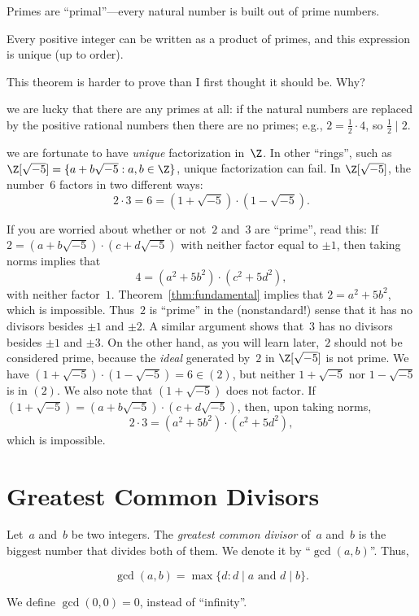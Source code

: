 \documentclass[11pt]{report}
\begin{document}
Primes are ``primal''---every natural number is
built out of prime numbers.
\begin{theorem}\label{thm:fundamental}
  Every positive integer can be written as a product of primes,
  and this expression is unique (up to order).
\end{theorem}

 This theorem is harder to prove than I first thought it
should be.  Why?

we are lucky that there are any primes at all: if
the natural numbers are replaced by the positive rational numbers then
there are no primes; e.g., $2 = \frac{1}{2}\cdot 4$, so
$\frac{1}{2}\mid 2$.

we are fortunate to have {\em unique}
factorization in~$\Z$. In other ``rings'', such as $\Z[\sqrt{-5}]
  = \{a + b\sqrt{-5} : a, b\in\Z\}$, unique factorization can fail.
In $\Z[\sqrt{-5}]$, the number~$6$ factors in two different ways:
$$2\cdot 3 = 6 = (1+\sqrt{-5})\cdot (1-\sqrt{-5}).$$

\begin{advanced}
  If you are worried about whether or not~$2$ and~$3$ are ``prime'', read this:
  If $2 = (a+b\sqrt{-5})\cdot (c+d\sqrt{-5})$ with neither factor equal
  to $\pm 1$, then taking norms implies that
  $$4 = (a^2 + 5b^2)\cdot (c^2 + 5d^2),$$
  with neither
  factor~$1$.  Theorem~\ref{thm:fundamental} implies that
  $2=a^2 + 5b^2$, which is impossible.
  Thus~$2$ is ``prime'' in the (nonstandard!) sense that it
  has no divisors besides $\pm 1$ and $\pm 2$.
  A similar argument shows that~$3$
  has no divisors besides $\pm 1$ and $\pm 3$.
  On the other hand, as you will learn later,~$2$ should not be
  considered prime, because the {\em ideal} generated by~$2$
  in $\Z[\sqrt{-5}]$ is not prime.  We have
  $(1+\sqrt{-5})\cdot (1-\sqrt{-5}) = 6\in (2)$, but
  neither $1+\sqrt{-5}$ nor $1-\sqrt{-5}$ is in $(2)$.
  We also note that $(1+\sqrt{-5})$ does not factor.
  If $(1+\sqrt{-5}) = (a+b\sqrt{-5})\cdot (c+d\sqrt{-5})$,
  then, upon taking norms,
  $$2\cdot 3 = (a^2 + 5b^2)\cdot (c^2 + 5d^2),$$
  which is impossible.

\end{advanced}



\section{Greatest Common Divisors}
Let~$a$ and~$b$ be two integers.  The {\em greatest common divisor}
of~$a$ and~$b$ is the biggest number that divides both of them.
We denote it by ``$\gcd(a,b)$''.  Thus,
\begin{definition}
  $$\gcd(a,b)=\max\{d : d \mid a\text{ and } d\mid b\}.$$
\end{definition}
 We define $\gcd(0,0)=0$, instead of ``infinity''.\vspace{1ex}
\end{document}
